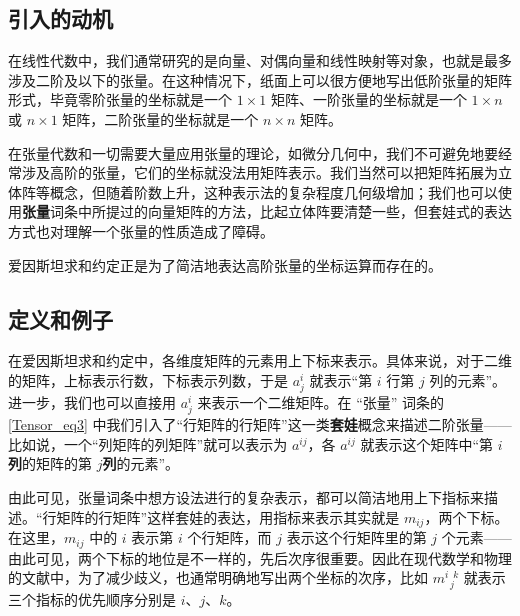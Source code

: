 
\begin{issues}
\end{issues}



\subsection{引入的动机}

在线性代数中，我们通常研究的是向量、对偶向量和线性映射等对象，也就是最多涉及二阶及以下的张量。在这种情况下，纸面上可以很方便地写出低阶张量的矩阵形式，毕竟零阶张量的坐标就是一个 $1\times 1$ 矩阵、一阶张量的坐标就是一个 $1\times n$ 或 $n\times 1$ 矩阵，二阶张量的坐标就是一个 $n\times n$ 矩阵。

在张量代数和一切需要大量应用张量的理论，如微分几何中，我们不可避免地要经常涉及高阶的张量，它们的坐标就没法用矩阵表示。我们当然可以把矩阵拓展为立体阵等概念，但随着阶数上升，这种表示法的复杂程度几何级增加；我们也可以使用\textbf{张量}词条中所提过的向量矩阵的方法，比起立体阵要清楚一些，但套娃式的表达方式也对理解一个张量的性质造成了障碍。

爱因斯坦求和约定正是为了简洁地表达高阶张量的坐标运算而存在的。

\subsection{定义和例子}

在爱因斯坦求和约定中，各维度矩阵的元素用上下标来表示。具体来说，对于二维的矩阵，上标表示行数，下标表示列数，于是 $a^i_j$ 就表示“第 $i$ 行第 $j$ 列的元素”。进一步，我们也可以直接用 $a^i_j$ 来表示一个二维矩阵。在 “张量” 词条的\autoref{Tensor_eq3} 中我们引入了“行矩阵的行矩阵”这一类\textbf{套娃}概念来描述二阶张量——比如说，一个“列矩阵的列矩阵”就可以表示为 $a^{ij}$，各 $a^{ij}$ 就表示这个矩阵中“第 $i$\textbf{列}的矩阵的第 $j$\textbf{列}的元素”。

由此可见，张量词条中想方设法进行的复杂表示，都可以简洁地用上下指标来描述。“行矩阵的行矩阵”这样套娃的表达，用指标来表示其实就是 $m_{ij}$，两个下标。在这里，$m_{ij}$ 中的 $i$ 表示第 $i$ 个行矩阵，而 $j$ 表示这个行矩阵里的第 $j$ 个元素——由此可见，两个下标的地位是不一样的，先后次序很重要。因此在现代数学和物理的文献中，为了减少歧义，也通常明确地写出两个坐标的次序，比如 $m^{i\phantom{1}k}_{\phantom{1}j}$ 就表示三个指标的优先顺序分别是 $i$、$j$、$k$。

